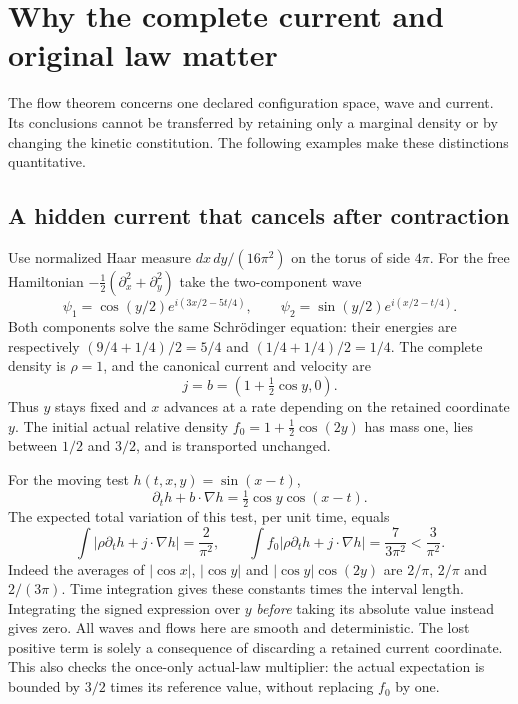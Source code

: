 \documentclass[11pt]{article}
\numberwithin{equation}{section}
\theoremstyle{definition}
\theoremstyle{remark}
\begin{document}
\section{Why the complete current and original law matter}\label{p3r:scope}
The flow theorem concerns one declared configuration space, wave and current. Its conclusions cannot be transferred by retaining only a marginal density or by changing the kinetic constitution. The following examples make these distinctions quantitative.

\subsection{A hidden current that cancels after contraction}\label{p3r:hidden}
Use normalized Haar measure $dx\,dy/(16\pi^2)$ on the torus of side $4\pi$. For the free Hamiltonian $-\tfrac12(\partial_x^2+\partial_y^2)$ take the two-component wave
\begin{equation}\label{p3r:torus-wave}
 \psi_1=\cos(y/2)e^{i(3x/2-5t/4)},\qquad
 \psi_2=\sin(y/2)e^{i(x/2-t/4)}.
\end{equation}
Both components solve the same Schr\"odinger equation: their energies are respectively $(9/4+1/4)/2=5/4$ and $(1/4+1/4)/2=1/4$. The complete density is $\rho=1$, and the canonical current and velocity are
\[
 j=b=(1+\tfrac12\cos y,0).
\]
Thus $y$ stays fixed and $x$ advances at a rate depending on the retained coordinate $y$. The initial actual relative density $f_0=1+\tfrac12\cos(2y)$ has mass one, lies between $1/2$ and $3/2$, and is transported unchanged.

For the moving test $h(t,x,y)=\sin(x-t)$,
\[
 \partial_t h+b\cdot\nabla h=\tfrac12\cos y\cos(x-t).
\]
The expected total variation of this test, per unit time, equals
\begin{equation}\label{p3r:hidden-exact}
 \int|\rho\partial_t h+j\cdot\nabla h|
   =\frac{2}{\pi^2},\qquad
 \int f_0|\rho\partial_t h+j\cdot\nabla h|
   =\frac{7}{3\pi^2}<\frac{3}{\pi^2}.
\end{equation}
Indeed the averages of $|\cos x|$, $|\cos y|$ and $|\cos y|\cos(2y)$ are $2/\pi$, $2/\pi$ and $2/(3\pi)$. Time integration gives these constants times the interval length. Integrating the signed expression over $y$ \emph{before} taking its absolute value instead gives zero. All waves and flows here are smooth and deterministic. The lost positive term is solely a consequence of discarding a retained current coordinate. This also checks the once-only actual-law multiplier: the actual expectation is bounded by $3/2$ times its reference value, without replacing $f_0$ by one.
\end{document}
